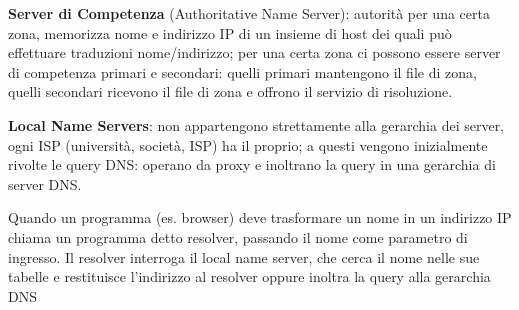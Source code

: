 \documentclass[11pt, italian, openany]{book}
\begin{document}
\begin{sloppypar}
\textbf{Server di Competenza} (Authoritative Name Server): autorità per una certa zona, memorizza nome e indirizzo IP di un insieme di host dei
quali può effettuare traduzioni nome/indirizzo; per una certa zona ci possono essere server di competenza primari e secondari:
quelli primari mantengono il file di zona, quelli secondari ricevono il file di zona e offrono il servizio di risoluzione.

\textbf{Local Name Servers}: non appartengono strettamente alla gerarchia dei server, ogni ISP (università, società, ISP) ha il proprio; a questi
vengono inizialmente rivolte le query DNS: operano da proxy e inoltrano la query in una gerarchia di server DNS.

Quando un programma (es. browser) deve trasformare un nome in
un indirizzo IP chiama un programma detto resolver, passando il
nome come parametro di ingresso.
Il resolver interroga il local name server, che cerca il nome nelle sue
tabelle e restituisce l’indirizzo al resolver oppure inoltra la query
alla gerarchia DNS


\end{sloppypar}
\end{document}
